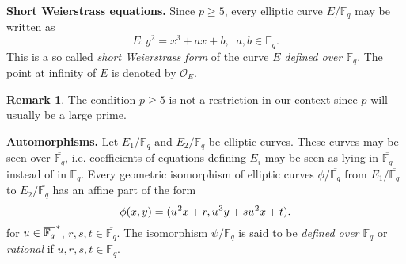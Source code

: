 \documentclass[10pt]{article}
\theoremstyle{definition}
\newtheorem{remark}{Remark}
\newcommand{\F}{\mathbb{F}}
\begin{document}
\vspace*{.1cm}
\noindent \textbf{Short Weierstrass equations.}  Since $p\geq 5$, every elliptic curve $E/\F_q$ may be written as
\[ E : y^2 = x^3 + ax + b, \; \; a,b \in \F_q. \]
This is a so called \textsl{short Weierstrass form} of the curve $E$ \textsl{defined over $\F_q$}.
The point at infinity of $E$ is denoted by $\mathcal{O}_E$.

\noindent \begin{remark} 
The condition $p \geq 5$ is not a restriction in our context since $p$ will usually be a large prime.
\end{remark}

\noindent \textbf{Automorphisms.} Let $E_1/\F_q$ and $E_2/\F_q$ be elliptic curves. 
These curves may be seen over $\overline{\F_q}$, i.e. coefficients of equations defining $E_i$ may be seen as lying in $\overline{\F_q}$ instead of in $\F_q$.
Every geometric isomorphism of elliptic curves $\phi/\overline{\F_q}$
from $E_1/\overline{\F_q}$ to $E_2/\overline{\F_q}$ has an  affine part of the form 
\begin{equation}\label{morphism}
 \phi(x,y) = (u^{\mkern1mu 2}x + r, u^{\mkern1mu 3}y + su^{\mkern1mu 2}x + t).
\end{equation}
for $u \in \overline{\F_q}^{\mkern1mu *}$, $r,s,t \in \overline{\F_q}$.
The isomorphism $\psi/\F_q$ is said to be \textsl{defined over $\F_q$} or \textsl{rational} if $u,r,s,t \in \F_q$.
\end{document}
